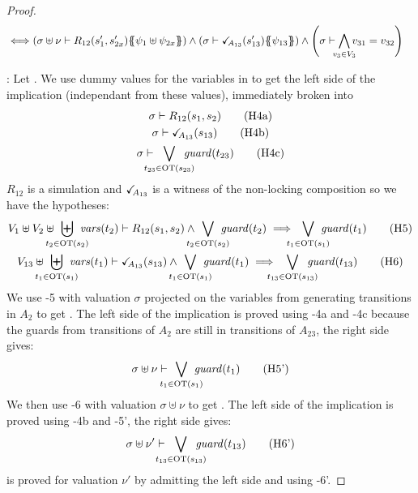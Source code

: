 \documentclass{article}
\begin{document}
\begin{proof}
\begin{align*}
		\iff & \mpar{\sigma \uplus \nu \vdash R_{12}\mpar{s'_1, s'_{2x}}\psubst{\psi_1 \uplus \psi_{2x}}} \wedge \mpar{\sigma \vdash \reach{A_{13}}\mpar{s'_{13}}\psubst{\psi_{13}}} \wedge \mpar{\sigma \vdash \bigwedge_\subbox{v_3 \in V_3} v_{31} = v_{32}}
	\end{align*}
\item[\goal{1}:] Let .
	We use dummy values for the variables in  to get the left side of the implication (independant from these values), immediately broken into
	\begin{gather}
		\sigma \vdash R_{12}\mpar{s_1, s_2} \hyp{4a} \\
		\sigma \vdash \reach{A_{13}}\mpar{s_{13}} \hyp{4b} \\
		\sigma \vdash \bigvee_\subbox{t_{23} \in \fOT{s_{23}}} \fguard{t_{23}} \hyp{4c}
	\end{gather}
	\(R_{12}\) is a simulation and \(\checkmark_{\!\! A_{13}}\) is a witness of the non-locking composition so we have the hypotheses:
	\begin{gather}
		V_1 \uplus V_2 \uplus \biguplus_\subbox{t_2 \in \fOT{s_2}} \fvars{t_2} \vdash R_{12}\mpar{s_1, s_2} \wedge \bigvee_\subbox{t_2 \in \fOT{s_2}} \fguard{t_2} \implies \bigvee_\subbox{t_1 \in \fOT{s_1}} \fguard{t_1} \hyp{5} \\
		V_{13} \uplus \biguplus_\subbox{t_1 \in \fOT{s_1}} \fvars{t_1} \vdash \reach{A_{13}}\mpar{s_{13}} \wedge \bigvee_\subbox{t_1 \in \fOT{s_1}} \fguard{t_1} \implies \bigvee_\subbox{t_{13} \in \fOT{s_{13}}} \fguard{t_{13}} \hyp{6}
	\end{gather}
	We use \hyp{5} with valuation \(\sigma\) projected on the variables from generating transitions in \(A_2\) to get .
	The left side of the implication is proved using \hyp{4a} and \hyp{4c} because the guards from transitions of \(A_2\) are still in transitions of \(A_{23}\), the right side gives:
	\[ \sigma \uplus \nu \vdash \bigvee_\subbox{t_1 \in \fOT{s_1}} \fguard{t_1} \hyp{5'} \]
	We then use \hyp{6} with valuation \(\sigma \uplus \nu\) to get .
	The left side of the implication is proved using \hyp{4b} and \hyp{5'}, the right side gives:
	\[ \sigma \uplus \nu' \vdash \bigvee_\subbox{t_{13} \in \fOT{s_{13}}} \fguard{t_{13}} \hyp{6'} \]
	 is proved for valuation \(\nu'\) by admitting the left side and using \hyp{6'}.
\end{proof}
\end{document}
